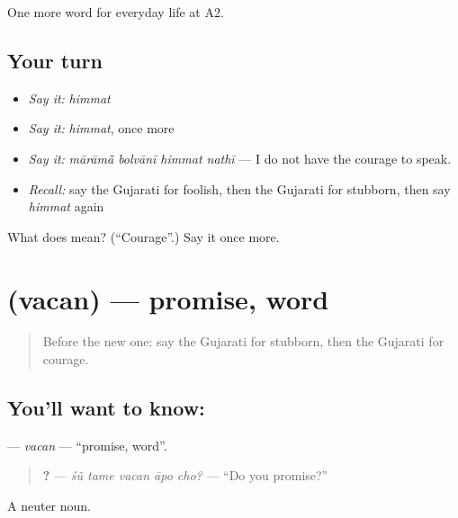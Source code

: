 \begin{grammarlens}[title={What you've built}]
One more word for everyday life at A2.
\end{grammarlens}

\subsection*{Your turn}
\begin{itemize}
\raggedright
  \item \emph{Say it:} \emph{himmat}
  \item \emph{Say it:} \emph{himmat}, once more
  \item \emph{Say it:} \emph{mārāmā̃ bolvānī himmat nathī} — I do not have the courage to speak.
  \item \emph{Recall:} say the Gujarati for foolish, then the Gujarati for stubborn, then say \emph{himmat} again
\end{itemize}

\begin{tcolorbox}[breakable,colback=teal!4,colframe=teal!35!black,title={Before you move on}]
What does  mean? (\textquotedblleft{}Courage\textquotedblright{}.) Say it once more.
\end{tcolorbox}
\section[\texorpdfstring{\gu{વચન} (vacan)}{વચન (vacan)}]{ (vacan) — promise, word}

\label{lesson:GU-C272-vacan}



\begin{quote}
Before the new one: say the Gujarati for stubborn, then the Gujarati for courage.
\end{quote}

\subsection*{You'll want to know: }
\textbf{} — \emph{vacan} — \textquotedblleft{}promise, word\textquotedblright{}.

\begin{quote}
\textbf{    ?} — \emph{śũ tame vacan āpo cho?} — \textquotedblleft{}Do you promise?\textquotedblright{}
\end{quote}

A neuter noun.

